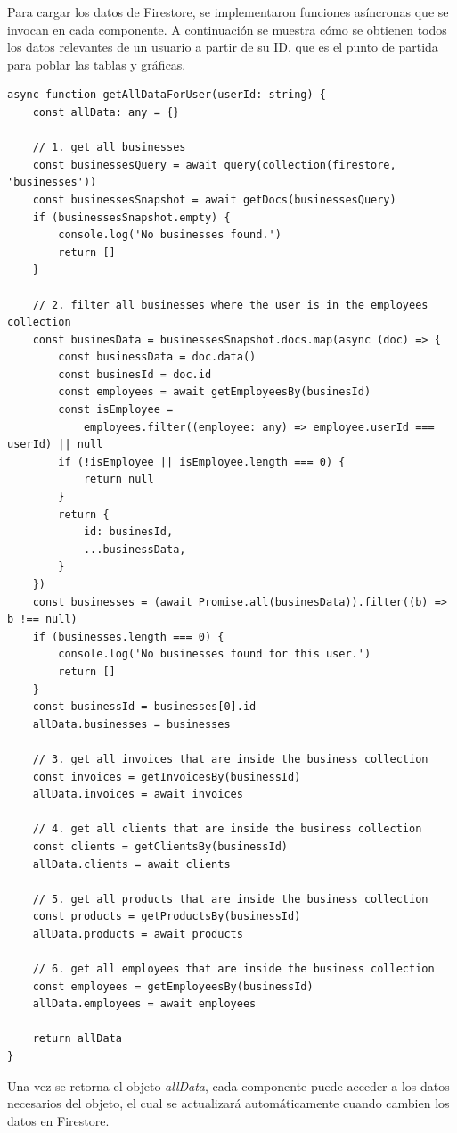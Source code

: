 \begin{large}

Para cargar los datos de Firestore, se implementaron funciones asíncronas que se invocan en cada componente. A continuación se muestra cómo se obtienen todos los datos relevantes de un usuario a partir de su ID, que es el punto de partida para poblar las tablas y gráficas.

\begin{lstlisting}[language={}, caption={Función para obtener todos los datos de un usuario a partir de su ID}]
async function getAllDataForUser(userId: string) {
	const allData: any = {}

	// 1. get all businesses
	const businessesQuery = await query(collection(firestore, 'businesses'))
	const businessesSnapshot = await getDocs(businessesQuery)
	if (businessesSnapshot.empty) {
		console.log('No businesses found.')
		return []
	}

	// 2. filter all businesses where the user is in the employees collection
	const businesData = businessesSnapshot.docs.map(async (doc) => {
		const businessData = doc.data()
		const businesId = doc.id
		const employees = await getEmployeesBy(businesId)
		const isEmployee =
			employees.filter((employee: any) => employee.userId === userId) || null
		if (!isEmployee || isEmployee.length === 0) {
			return null
		}
		return {
			id: businesId,
			...businessData,
		}
	})
	const businesses = (await Promise.all(businesData)).filter((b) => b !== null)
	if (businesses.length === 0) {
		console.log('No businesses found for this user.')
		return []
	}
	const businessId = businesses[0].id
	allData.businesses = businesses

	// 3. get all invoices that are inside the business collection
	const invoices = getInvoicesBy(businessId)
	allData.invoices = await invoices

	// 4. get all clients that are inside the business collection
	const clients = getClientsBy(businessId)
	allData.clients = await clients

	// 5. get all products that are inside the business collection
	const products = getProductsBy(businessId)
	allData.products = await products

	// 6. get all employees that are inside the business collection
	const employees = getEmployeesBy(businessId)
	allData.employees = await employees

	return allData
}
\end{lstlisting}

Una vez se retorna el objeto \textit{allData}, cada componente puede acceder a los datos necesarios del objeto, el cual se actualizará automáticamente cuando cambien los datos en Firestore.


\end{large}
